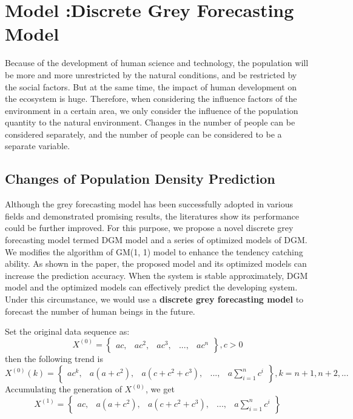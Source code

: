 \documentclass[a4paper,11pt]{article}
\begin{document}
\section{Model \uppercase\expandafter{}:Discrete Grey Forecasting Model}

\par Because of the development of human science and technology, the population will be more and more unrestricted by the natural conditions, and be restricted by the social factors. But at the same time, the impact of human development on the ecosystem is huge. Therefore, when considering the influence factors of the environment in a certain area, we only consider the influence of the population quantity to the natural environment. Changes in the number of people can be considered separately, and the number of people can be considered to be a separate variable.

\subsection{Changes of Population Density Prediction}
\par Although the grey forecasting model has been successfully adopted in various fields and demonstrated promising results, the literatures show its performance could be further improved. For this purpose, we propose a novel discrete grey forecasting model termed DGM model and a series of optimized models of DGM. We modifies the algorithm of GM(1, 1) model to enhance the tendency catching ability. As shown in the paper, the proposed model and its optimized models can increase the prediction accuracy. When the system is stable approximately, DGM model and the optimized models can effectively predict the developing system. Under this circumstance, we would use a \textbf{discrete grey forecasting model} to forecast the number of human beings in the future.

\par Set the original data sequence as:
\begin{equation}
{X}^{(0)}=\begin{Bmatrix}
ac,&ac^2,&ac^3,&...,&ac^n 
\end{Bmatrix}, c>0
\label{eq:1} 
\end{equation}
then the following trend is
\begin{equation}
{X}^{(0)}(k)=\begin{Bmatrix}
ac^k,&a(a+c^2),&a(c+c^2+c^3),&...,&a\sum_{i=1}^{n}c^i
\end{Bmatrix}, k=n+1,n+2,...
\end{equation}
Accumulating the generation of ${X}^{(0)}$, we get
\begin{equation}
{X}^{(1)}=\begin{Bmatrix}
ac,&a(a+c^2),&a(c+c^2+c^3),&...,&a\sum_{i=1}^{n}c^i
\end{Bmatrix}
\end{equation}
\end{document}
